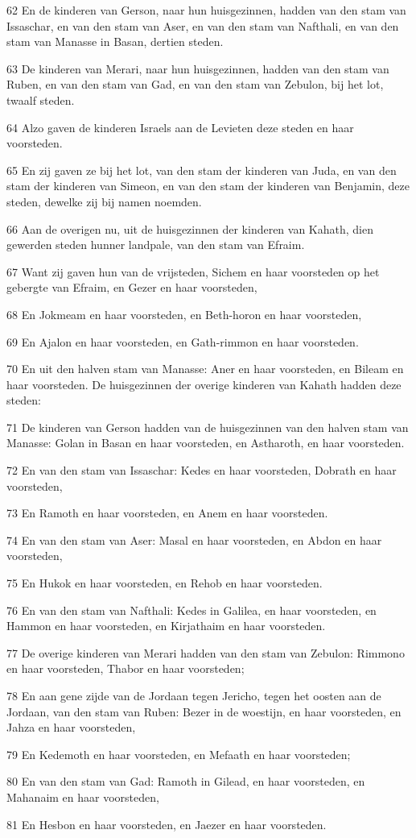 \par 62 En de kinderen van Gerson, naar hun huisgezinnen, hadden van den stam van Issaschar, en van den stam van Aser, en van den stam van Nafthali, en van den stam van Manasse in Basan, dertien steden.
\par 63 De kinderen van Merari, naar hun huisgezinnen, hadden van den stam van Ruben, en van den stam van Gad, en van den stam van Zebulon, bij het lot, twaalf steden.
\par 64 Alzo gaven de kinderen Israels aan de Levieten deze steden en haar voorsteden.
\par 65 En zij gaven ze bij het lot, van den stam der kinderen van Juda, en van den stam der kinderen van Simeon, en van den stam der kinderen van Benjamin, deze steden, dewelke zij bij namen noemden.
\par 66 Aan de overigen nu, uit de huisgezinnen der kinderen van Kahath, dien gewerden steden hunner landpale, van den stam van Efraim.
\par 67 Want zij gaven hun van de vrijsteden, Sichem en haar voorsteden op het gebergte van Efraim, en Gezer en haar voorsteden,
\par 68 En Jokmeam en haar voorsteden, en Beth-horon en haar voorsteden,
\par 69 En Ajalon en haar voorsteden, en Gath-rimmon en haar voorsteden.
\par 70 En uit den halven stam van Manasse: Aner en haar voorsteden, en Bileam en haar voorsteden. De huisgezinnen der overige kinderen van Kahath hadden deze steden:
\par 71 De kinderen van Gerson hadden van de huisgezinnen van den halven stam van Manasse: Golan in Basan en haar voorsteden, en Astharoth, en haar voorsteden.
\par 72 En van den stam van Issaschar: Kedes en haar voorsteden, Dobrath en haar voorsteden,
\par 73 En Ramoth en haar voorsteden, en Anem en haar voorsteden.
\par 74 En van den stam van Aser: Masal en haar voorsteden, en Abdon en haar voorsteden,
\par 75 En Hukok en haar voorsteden, en Rehob en haar voorsteden.
\par 76 En van den stam van Nafthali: Kedes in Galilea, en haar voorsteden, en Hammon en haar voorsteden, en Kirjathaim en haar voorsteden.
\par 77 De overige kinderen van Merari hadden van den stam van Zebulon: Rimmono en haar voorsteden, Thabor en haar voorsteden;
\par 78 En aan gene zijde van de Jordaan tegen Jericho, tegen het oosten aan de Jordaan, van den stam van Ruben: Bezer in de woestijn, en haar voorsteden, en Jahza en haar voorsteden,
\par 79 En Kedemoth en haar voorsteden, en Mefaath en haar voorsteden;
\par 80 En van den stam van Gad: Ramoth in Gilead, en haar voorsteden, en Mahanaim en haar voorsteden,
\par 81 En Hesbon en haar voorsteden, en Jaezer en haar voorsteden.

